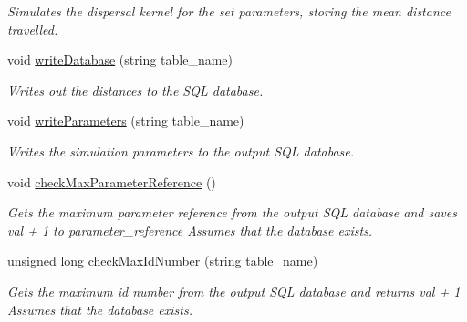 \begin{DoxyCompactItemize}
\begin{DoxyCompactList}\small\item\em Simulates the dispersal kernel for the set parameters, storing the mean distance travelled. \end{DoxyCompactList}\item 
void \hyperlink{class_simulate_dispersal_af7d0a726cb3724c159ca46f4586a8bd3}{write\+Database} (string table\+\_\+name)
\begin{DoxyCompactList}\small\item\em Writes out the distances to the S\+QL database. \end{DoxyCompactList}\item 
void \hyperlink{class_simulate_dispersal_ae0afed6eeb06f5bae4ee13a24850c8c5}{write\+Parameters} (string table\+\_\+name)
\begin{DoxyCompactList}\small\item\em Writes the simulation parameters to the output S\+QL database. \end{DoxyCompactList}\item 
void \hyperlink{class_simulate_dispersal_a0dee5d1529bd7ee6f382f7cd1b5393e5}{check\+Max\+Parameter\+Reference} ()\hypertarget{class_simulate_dispersal_a0dee5d1529bd7ee6f382f7cd1b5393e5}{}\label{class_simulate_dispersal_a0dee5d1529bd7ee6f382f7cd1b5393e5}

\begin{DoxyCompactList}\small\item\em Gets the maximum parameter reference from the output S\+QL database and saves val + 1 to parameter\+\_\+reference Assumes that the database exists. \end{DoxyCompactList}\item 
unsigned long \hyperlink{class_simulate_dispersal_abafd3fc30df157d12e462c4b1907d8fa}{check\+Max\+Id\+Number} (string table\+\_\+name)
\begin{DoxyCompactList}\small\item\em Gets the maximum id number from the output S\+QL database and returns val + 1 Assumes that the database exists. \end{DoxyCompactList}\end{DoxyCompactItemize}
